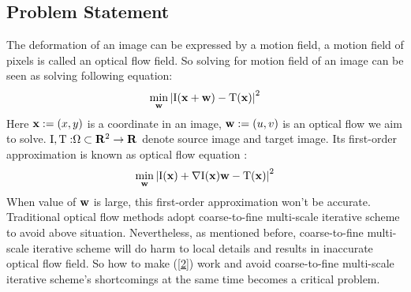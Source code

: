 \documentclass{article}
\begin{document}
\subsection{Problem Statement}
The deformation of an image can be expressed by a motion field, a motion field of pixels is called an optical flow field.
So solving for motion field of an image can be seen as solving following equation:
\begin{equation}\label{1}
\mathop {\min }\limits_{\bf{w}} {\left| {{\rm{I}}({\bf{x}} + {\bf{w}}) - {\rm{T}}({\bf{x}})} \right|^2}
\end{equation}
Here ${\bf{x}}: = (x,y)$ is a coordinate in an image, ${\bf{w}}: = (u,v)$ is an optical flow we aim to solve.
${\rm{I,T:}}\Omega  \subset {{\bf{R}}^2} \to {\bf{R}}$ denote source image and target image.
Its first-order approximation is known as optical flow equation \cite{horn1981determining}:
\begin{equation}\label{2}
\mathop {\min }\limits_{\bf{w}} {\left| {{\rm{I}}({\bf{x}}) + \nabla {\rm{I}}({\bf{x}}){\bf{w}} - {\rm{T}}({\bf{x}})} \right|^2}
\end{equation}
When value of ${\bf{w}}$ is large, this first-order approximation won't be accurate.
Traditional optical flow methods adopt coarse-to-fine multi-scale iterative scheme to avoid above situation. Nevertheless, as mentioned before, coarse-to-fine multi-scale iterative scheme will do harm to local details and results in inaccurate optical flow field.
So how to make (\ref{2}) work and avoid coarse-to-fine multi-scale iterative scheme's shortcomings at the same time becomes a critical problem.
\end{document}
